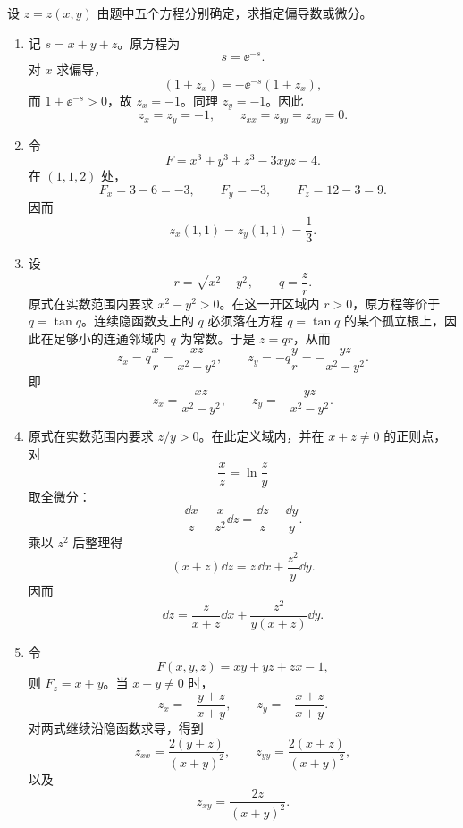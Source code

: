 \begin{xexercise}[20.1.4 练习题 3]
设 $z=z(x,y)$ 由题中五个方程分别确定，求指定偏导数或微分。
\end{xexercise}
\begin{xsolution}
\begin{enumerate}[label=(\arabic*)]
  \item 记 $s=x+y+z$。原方程为
  \[
    s=\ee^{-s}.
  \]
  对 $x$ 求偏导，
  \[
    (1+z_x)=-\ee^{-s}(1+z_x),
  \]
  而 $1+\ee^{-s}>0$，故 $z_x=-1$。同理 $z_y=-1$。因此
  \[
    \boxed{z_x=z_y=-1,\qquad z_{xx}=z_{yy}=z_{xy}=0}.
  \]

  \item 令
  \[
    F=x^3+y^3+z^3-3xyz-4.
  \]
  在 $(1,1,2)$ 处，
  \[
    F_x=3-6=-3,\qquad F_y=-3,
    \qquad F_z=12-3=9.
  \]
  因而
  \[
    \boxed{z_x(1,1)=z_y(1,1)=\frac13}.
  \]

  \item 设
  \[
    r=\sqrt{x^2-y^2},\qquad q=\frac zr.
  \]
  原式在实数范围内要求 $x^2-y^2>0$。在这一开区域内 $r>0$，原方程等价于 $q=\tan q$。连续隐函数支上的 $q$ 必须落在方程 $q=\tan q$ 的某个孤立根上，因此在足够小的连通邻域内 $q$ 为常数。于是 $z=qr$，从而
  \[
    z_x=q\frac xr=\frac{xz}{x^2-y^2},
    \qquad
    z_y=-q\frac yr=-\frac{yz}{x^2-y^2}.
  \]
  即
  \[
    \boxed{\displaystyle
      z_x=\frac{xz}{x^2-y^2},\qquad
      z_y=-\frac{yz}{x^2-y^2}}.
  \]

  \item 原式在实数范围内要求 $z/y>0$。在此定义域内，并在 $x+z\ne0$ 的正则点，对
  \[
    \frac xz=\ln\frac zy
  \]
  取全微分：
  \[
    \frac{\dd x}{z}-\frac{x}{z^2}\dd z
    =\frac{\dd z}{z}-\frac{\dd y}{y}.
  \]
  乘以 $z^2$ 后整理得
  \[
    (x+z)\dd z=z\,\dd x+\frac{z^2}{y}\dd y.
  \]
  因而
  \[
    \boxed{\displaystyle
      \dd z=\frac{z}{x+z}\dd x
      +\frac{z^2}{y(x+z)}\dd y}.
  \]

  \item 令
  \[
    F(x,y,z)=xy+yz+zx-1,
  \]
  则 $F_z=x+y$。当 $x+y\ne0$ 时，
  \[
    z_x=-\frac{y+z}{x+y},
    \qquad
    z_y=-\frac{x+z}{x+y}.
  \]
  对两式继续沿隐函数求导，得到
  \[
    \boxed{\displaystyle
      z_{xx}=\frac{2(y+z)}{(x+y)^2}},
    \qquad
    \boxed{\displaystyle
      z_{yy}=\frac{2(x+z)}{(x+y)^2}},
  \]
  以及
  \[
    \boxed{\displaystyle
      z_{xy}=\frac{2z}{(x+y)^2}}.
  \]
\end{enumerate}
\end{xsolution}

